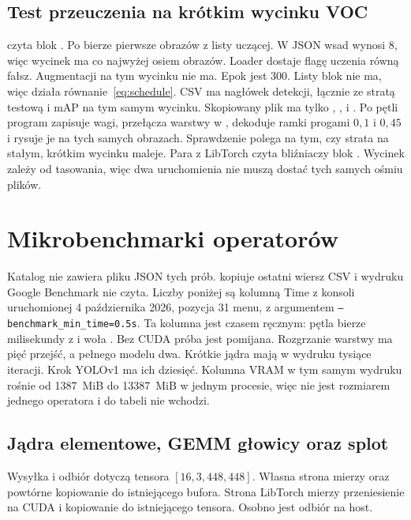 \subsection{Test przeuczenia na krótkim wycinku VOC}

 czyta blok . Po  bierze pierwsze  obrazów z listy uczącej. W JSON wsad wynosi \(8\), więc wycinek ma co najwyżej osiem obrazów. Loader dostaje flagę uczenia równą fałsz. Augmentacji na tym wycinku nie ma. Epok jest \(300\). Listy  blok nie ma, więc działa równanie~\eqref{eq:schedule}. CSV ma nagłówek detekcji, łącznie ze stratą testową i mAP na tym samym wycinku. Skopiowany plik ma tylko , ,  i . Po pętli program zapisuje wagi, przełącza warstwy w , dekoduje ramki progami \(0{,}1\) i \(0{,}45\) i rysuje je na tych samych obrazach. Sprawdzenie polega na tym, czy strata na stałym, krótkim wycinku maleje. Para z LibTorch czyta bliźniaczy blok . Wycinek zależy od tasowania, więc dwa uruchomienia nie muszą dostać tych samych ośmiu plików.

\section{Mikrobenchmarki operatorów}

Katalog  nie zawiera pliku JSON tych prób.  kopiuje ostatni wiersz CSV i wydruku Google Benchmark nie czyta. Liczby poniżej są kolumną Time z konsoli uruchomionej 4 października 2026, pozycja 31 menu, z argumentem \texttt{--benchmark\_min\_time=0.5s}. Ta kolumna jest czasem ręcznym: pętla bierze milisekundy z  i woła . Bez CUDA próba jest pomijana. Rozgrzanie warstwy ma pięć przejść, a pełnego modelu dwa. Krótkie jądra mają w wydruku tysiące iteracji. Krok YOLOv1 ma ich dziesięć. Kolumna VRAM w tym samym wydruku rośnie od 1387~MiB do 13387~MiB w jednym procesie, więc nie jest rozmiarem jednego operatora i do tabeli nie wchodzi.

\subsection{Jądra elementowe, GEMM głowicy oraz splot}

Wysyłka i odbiór dotyczą tensora \([16, 3, 448, 448]\). Własna strona mierzy  oraz powtórne kopiowanie do istniejącego bufora. Strona LibTorch mierzy przeniesienie na CUDA i kopiowanie do istniejącego tensora. Osobno jest odbiór na host.

